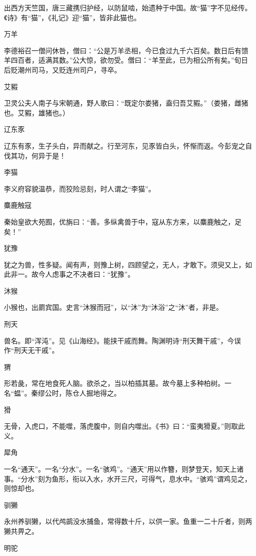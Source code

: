 \documentclass[a4paper,12pt,UTF8,twoside]{ctexbook}
\begin{document}
    出西方天竺国，唐三藏携归护经，以防鼠啮，始遗种于中国。故“猫”字不见经传。《诗》有“猫”，《礼记》迎“猫”，皆非此猫也。
    
    万羊
    
    李德裕召一僧问休咎，僧曰：“公是万羊丞相，今已食过九千六百矣。数日后有馈羊四百者，适满其数。”公大惊，欲勿受。僧曰：“羊至此，已为相公所有矣。”旬日后贬潮州司马，又贬连州司户，寻卒。
    
    艾豭
    
    卫灵公夫人南子与宋朝通，野人歌曰：“既定尔娄猪，盍归吾艾豭。”（娄猪，雌猪也。艾豭，雄猪也。）
    
    辽东豕
    
    辽东有豕，生子头白，异而献之。行至河东，见豕皆白头，怀惭而返。今彭宠之自伐其功，何异于是！
    
    李猫
    
    李义府容貌温恭，而狡险忌刻，时人谓之“李猫”。
    
    麋鹿触寇
    
    秦始皇欲大苑囿，优旃曰：“善。多纵禽兽于中，寇从东方来，以麋鹿触之，足矣！”
    
    犹豫
    
    犹之为兽，性多疑。闻有声，则豫上树，四顾望之，无人，才敢下。须臾又上，如此非一。故今人虑事之不决者曰：“犹豫”。
    
    沐猴
    
    小猴也，出罽宾国。史言“沐猴而冠”，以“沐”为“沐浴”之“沐”者，非是。
    
    刑天
    
    兽名。即“浑沌”。见《山海经》。能挟干戚而舞。陶渊明诗“刑天舞干戚”，今误作“刑天无干戚”。
    
    猬
    
    形若彘，常在地食死人脑。欲杀之，当以柏插其墓。故今墓上多种柏树。一名“蝹”。秦缪公时，陈仓人掘地得之。
    
    猾
    
    无骨，入虎口，不能噬，落虎腹中，则自内噬出。《书》曰：“蛮夷猾夏。”则取此义。
    
    犀角
    
    一名“通天”。一名“分水”。一名“骇鸡”。“通天”用以作簪，则梦登天，知天上诸事。“分水”刻为鱼形，衔以入水，水开三尺，可得气，息水中。“骇鸡”谓鸡见之，则惊却也。
    
    驯獭
    
    永州养驯獭，以代鸬鹚没水捕鱼，常得数十斤，以供一家。鱼重一二十斤者，则两獭共畀之。
    
    明驼
    
\end{document}
